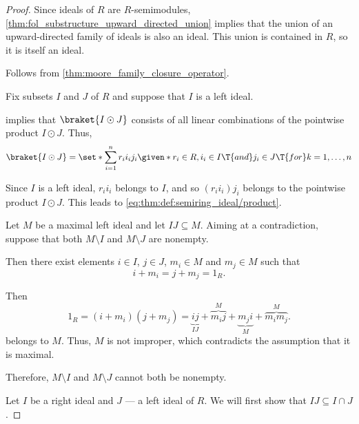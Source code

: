 \begin{proof}
   Since ideals of \( R \) are \( R \)-semimodules, \cref{thm:fol_substructure_upward_directed_union} implies that the union of an upward-directed family of ideals is also an ideal. This union is contained in \( R \), so it is itself an ideal.

   Follows from \cref{thm:moore_family_closure_operator}.

   Fix subsets \( I \) and \( J \) of \( R \) and suppose that \( I \) is a left ideal.

   implies that \( \braket{ I \odot J } \) consists of all linear combinations of the pointwise product \( I \odot J \). Thus,
  \begin{equation*}
    \braket{ I \odot J } = \set*{ \sum_{i=1}^n r_i i_i j_i \given* r_i \in R, i_i \in I \T{and} j_i \in J \T{for} k = 1, \ldots, n }
  \end{equation*}

  Since \( I \) is a left ideal, \( r_i i_i \) belongs to \( I \), and so \( (r_i i_i) j_i \) belongs to the pointwise product \( I \odot J \). This leads to \eqref{eq:thm:def:semiring_ideal/product}.

   Let \( M \) be a maximal left ideal and let \( IJ \subseteq M \). Aiming at a contradiction, suppose that both \( M \setminus I \) and \( M \setminus J \) are nonempty.

  Then there exist elements \( i \in I \), \( j \in J \), \( m_i \in M \) and \( m_j \in M \) such that
  \begin{equation*}
    i + m_i = j + m_j = 1_R.
  \end{equation*}

  Then
  \begin{equation*}
    1_R = (i + m_i) (j + m_j) = \underbrace{ij}_{IJ} + \overbrace{m_i j}^M + \underbrace{m_j i}_M + \overbrace{m_i m_j}^M.
  \end{equation*}
  belongs to \( M \). Thus, \( M \) is not improper, which contradicts the assumption that it is maximal.

  Therefore, \( M \setminus I \) and \( M \setminus J \) cannot both be nonempty.

  \SufficiencySubProof* Let \( I \) be a right ideal and \( J \) --- a left ideal of \( R \). We will first show that \( IJ \subseteq I \cap J \).


\end{proof}
